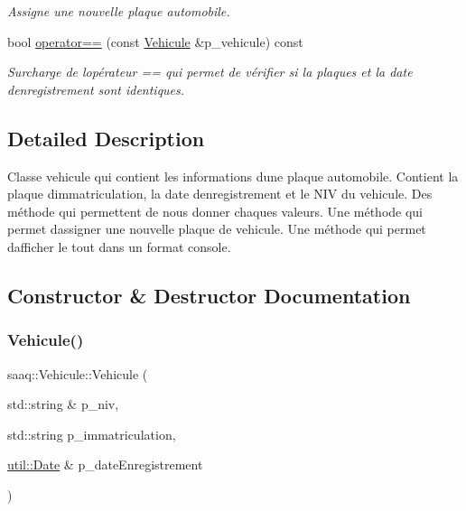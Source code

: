 \begin{DoxyCompactItemize}
\begin{DoxyCompactList}\small\item\em Assigne une nouvelle plaque automobile. \end{DoxyCompactList}\item 
bool \hyperlink{classsaaq_1_1Vehicule_a9dd4c5e7c74ebabd5f4ce651d21d79fc}{operator==} (const \hyperlink{classsaaq_1_1Vehicule}{Vehicule} \&p\+\_\+vehicule) const
\begin{DoxyCompactList}\small\item\em Surcharge de l\textquotesingle{}opérateur == qui permet de vérifier si la plaques et la date d\textquotesingle{}enregistrement sont identiques. \end{DoxyCompactList}\end{DoxyCompactItemize}


\subsection{Detailed Description}
Classe vehicule qui contient les informations d\textquotesingle{}une plaque automobile. Contient la plaque d\textquotesingle{}immatriculation, la date d\textquotesingle{}enregistrement et le N\+IV du vehicule. Des méthode qui permettent de nous donner chaques valeurs. Une méthode qui permet d\textquotesingle{}assigner une nouvelle plaque de vehicule. Une méthode qui permet d\textquotesingle{}afficher le tout dans un format console. 

\subsection{Constructor \& Destructor Documentation}
\mbox{\label{classsaaq_1_1Vehicule_a5484cacf87662d2d2e154632bb90cfca}} 
\subsubsection{\texorpdfstring{Vehicule()}{Vehicule()}}
{\footnotesize\ttfamily saaq\+::\+Vehicule\+::\+Vehicule (\begin{DoxyParamCaption}\item[{std\+::string \&}]{p\+\_\+niv,  }\item[{std\+::string}]{p\+\_\+immatriculation,  }\item[{\hyperlink{classutil_1_1Date}{util\+::\+Date} \&}]{p\+\_\+date\+Enregistrement }\end{DoxyParamCaption})}



